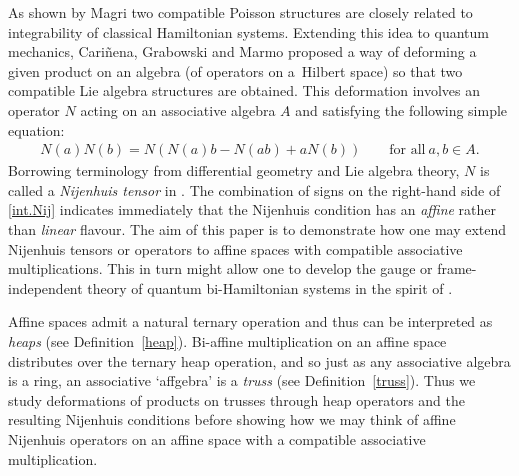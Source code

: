 \documentclass[pdftex]{sigma}
\numberwithin{equation}{section}
\begin{document}
As shown by Magri \cite{Mag:sim} two compatible Poisson structures are closely related to integrability of classical Hamiltonian systems. Extending this idea to quantum mechanics, Cari\~nena, Grabowski and Marmo \cite{4} proposed a way of deforming a given product on an algebra (of operators on a~Hilbert space) so that two compatible Lie algebra structures are obtained. This deformation involves an operator $N$ acting on an associative algebra $A$ and satisfying the following simple equation:
\begin{gather}\label{int.Nij}
 N(a)N(b) = N(N(a)b-N(ab)+aN(b)) \qquad \mbox{for all}\ a,b\in A.
\end{gather}
Borrowing terminology from differential geometry and Lie algebra theory, $N$ is called a {\em Nijenhuis tensor} in \cite{4}. The combination of signs on the right-hand side of \eqref{int.Nij} indicates immediately that the Nijenhuis condition has an {\em affine} rather than {\em linear} flavour. The aim of this paper is to demonstrate how one may extend Nijenhuis tensors or operators to affine spaces with compatible associative multiplications. This in turn might allow one to develop the gauge or frame-independent theory of quantum bi-Hamiltonian systems in the spirit of \cite{Ben:fib, MasVig:non, Tul:fra, Urb:aff, Wei:uni}.

Affine spaces admit a natural ternary operation and thus can be interpreted as \textit{heaps} (see Definition~\ref{heap}). Bi-affine multiplication on an affine space distributes over the ternary heap operation, and so just as any associative algebra is a ring, an associative `affgebra' is a \textit{truss} (see Definition~\ref{truss}). Thus we study deformations of products on trusses through heap operators and the resulting Nijenhuis conditions before showing how we may think of affine Nijenhuis operators on an affine space with a compatible associative multiplication.
\end{document}
